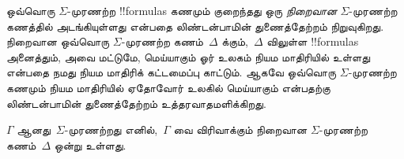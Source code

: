 \documentclass[../../../include/open-logic-section]{subfiles}
\begin{document}


ஒவ்வொரு $\Sigma$-முரணற்ற !!{formula}s கணமும் குறைந்தது ஒரு
\emph{நிறைவான} $\Sigma$-முரணற்ற கணத்தில் அடங்கியுள்ளது என்பதை
லிண்டன்பாமின் துணைத்தேற்றம் நிறுவுகிறது. நிறைவான ஒவ்வொரு
$\Sigma$-முரணற்ற கணம்~$\Delta$ க்கும்,~$\Delta$ விலுள்ள !!{formula}s
அனைத்தும், அவை மட்டுமே, மெய்யாகும் ஓர் உலகம் நியம மாதிரியில் உள்ளது என்பதை
நமது நியம மாதிரிக் கட்டமைப்பு காட்டும். ஆகவே ஒவ்வொரு
$\Sigma$-முரணற்ற கணமும் நியம மாதிரியில் ஏதோவோர் உலகில் மெய்யாகும் என்பதற்கு
லிண்டன்பாமின் துணைத்தேற்றம் உத்தரவாதமளிக்கிறது.

\begin{thm}[லிண்டன்பாமின் துணைத்தேற்றம்]
  $\Gamma$ ஆனது~$\Sigma$-முரணற்றது எனில்,~$\Gamma$ வை விரிவாக்கும்
  நிறைவான $\Sigma$-முரணற்ற கணம்~$\Delta$ ஒன்று உள்ளது.
\end{thm}
\end{document}
